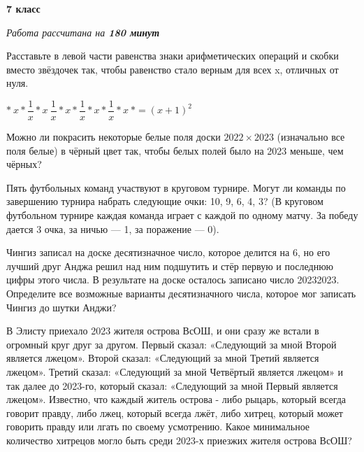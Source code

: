 \hspace{3mm}

\centerline{\bf \huge 7 класс}
\centerline{\normalsize{\it Работа рассчитана на \bf{180} минут}}

\hspace{3mm}

Расставьте в левой части равенства знаки арифметических операций и скобки вместо звёздочек так, чтобы равенство стало верным для всех x, отличных от нуля.

$* \ x  * \dfrac{1}{x} * x \ \dfrac{1}{x} * x * \dfrac{1}{x} * x * \dfrac{1}{x} * x \ * = (x+1)^2$

\hspace{3mm}

 Можно ли покрасить некоторые белые поля доски $2022\times2023$ (изначально все поля белые) в чёрный цвет так, чтобы белых полей было на 2023 меньше, чем чёрных?

\hspace{3mm}

 Пять футбольных команд участвуют в круговом турнире. Могут ли команды по завершению турнира набрать следующие очки: 10, 9, 6, 4, 3? (В круговом футбольном турнире каждая команда играет с каждой по одному матчу. За победу дается 3 очка, за ничью — 1, за поражение — 0).

\hspace{3mm}

 Чингиз записал на доске десятизначное число, которое делится на 6, но его лучший друг Анджа решил над ним подшутить и стёр первую и последнюю цифры этого числа. В результате на доске осталось записано число 20232023. Определите все возможные варианты десятизначного числа, которое мог записать Чингиз до шутки Анджи?

\hspace{3mm}

В Элисту приехало 2023 жителя острова ВсОШ, и они сразу же встали в огромный круг друг за другом. Первый сказал: «Следующий за мной Второй является лжецом». Второй сказал: «Следующий за мной Третий является лжецом». Третий сказал: «Следующий за мной Четвёртый является лжецом» и так далее до 2023-го, который сказал: «Следующий за мной Первый является лжецом». Известно, что каждый житель острова - либо рыцарь, который всегда говорит правду, либо лжец, который всегда лжёт, либо хитрец, который может говорить правду или лгать по своему усмотрению. Какое минимальное количество хитрецов могло быть среди 2023-х приезжих жителя острова ВсОШ?

